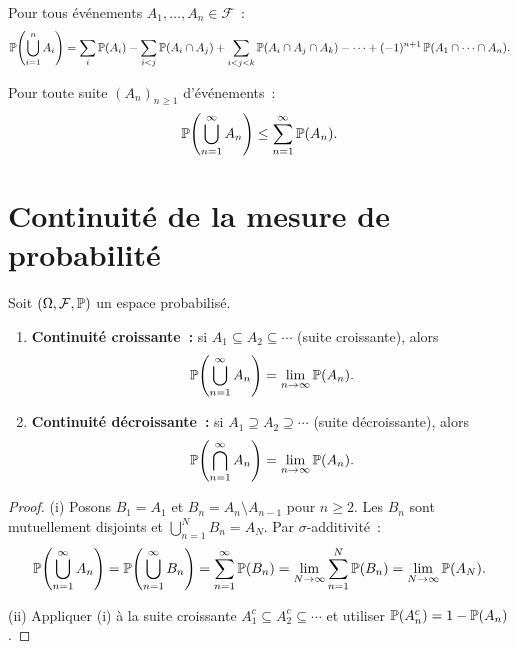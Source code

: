 \begin{theoreme}
\label{thm:inclusion_exclusion}
Pour tous \'ev\'enements $A_1, \ldots, A_n \in \mathcal{F}$~:
\[
    \mathbb{P}\!\left(\bigcup_{i=1}^{n} A_i\right)
    = \sum_{i} \mathbb{P}(A_i)
    - \sum_{i < j} \mathbb{P}(A_i \cap A_j)
    + \sum_{i < j < k} \mathbb{P}(A_i \cap A_j \cap A_k)
    - \cdots
    + (-1)^{n+1}\, \mathbb{P}(A_1 \cap \cdots \cap A_n).
\]
\end{theoreme}

\begin{corollaire}
Pour toute suite $(A_n)_{n \geq 1}$ d'\'ev\'enements~:
\[
    \mathbb{P}\!\left(\bigcup_{n=1}^{\infty} A_n\right)
    \leq \sum_{n=1}^{\infty} \mathbb{P}(A_n).
\]
\end{corollaire}

\section{Continuit\'e de la mesure de probabilit\'e}

\begin{theoreme}
\label{thm:continuite}
Soit $(\Omega, \mathcal{F}, \mathbb{P})$ un espace probabilis\'e.
\begin{enumerate}[label=(\roman*)]
    \item \textbf{Continuit\'e croissante~:} si $A_1 \subseteq A_2 \subseteq \cdots$
    (suite croissante), alors
    \[
        \mathbb{P}\!\left(\bigcup_{n=1}^{\infty} A_n\right)
        = \lim_{n \to \infty} \mathbb{P}(A_n).
    \]
    \item \textbf{Continuit\'e d\'ecroissante~:} si $A_1 \supseteq A_2 \supseteq \cdots$
    (suite d\'ecroissante), alors
    \[
        \mathbb{P}\!\left(\bigcap_{n=1}^{\infty} A_n\right)
        = \lim_{n \to \infty} \mathbb{P}(A_n).
    \]
\end{enumerate}
\end{theoreme}

\begin{proof}
(i) Posons $B_1 = A_1$ et $B_n = A_n \setminus A_{n-1}$ pour $n \geq 2$. Les $B_n$
sont mutuellement disjoints et $\bigcup_{n=1}^{N} B_n = A_N$. Par $\sigma$-additivit\'e~:
\[
    \mathbb{P}\!\left(\bigcup_{n=1}^{\infty} A_n\right)
    = \mathbb{P}\!\left(\bigcup_{n=1}^{\infty} B_n\right)
    = \sum_{n=1}^{\infty} \mathbb{P}(B_n)
    = \lim_{N \to \infty} \sum_{n=1}^{N} \mathbb{P}(B_n)
    = \lim_{N \to \infty} \mathbb{P}(A_N).
\]

(ii) Appliquer (i) \`a la suite croissante $A_1^c \subseteq A_2^c \subseteq \cdots$ et
utiliser $\mathbb{P}(A_n^c) = 1 - \mathbb{P}(A_n)$.
\end{proof}

